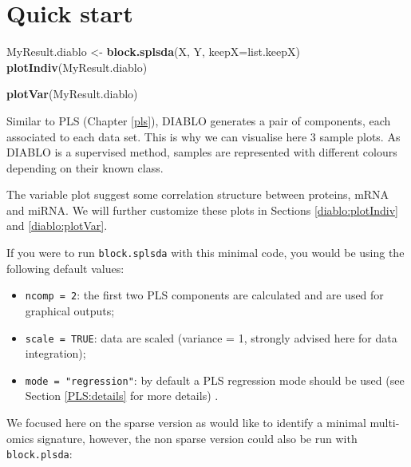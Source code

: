 \documentclass[]{book}
\newenvironment{Shaded}{\begin{snugshade}}{\end{snugshade}}
\newcommand{\DataTypeTok}[1]{\textcolor[rgb]{0.13,0.29,0.53}{#1}}
\newcommand{\KeywordTok}[1]{\textcolor[rgb]{0.13,0.29,0.53}{\textbf{#1}}}
\newcommand{\NormalTok}[1]{#1}
\newcommand{\StringTok}[1]{\textcolor[rgb]{0.31,0.60,0.02}{#1}}
\providecommand{\tightlist}{%
  \setlength{\itemsep}{0pt}\setlength{\parskip}{0pt}}
\begin{document}
\hypertarget{quick-start-3}{%
\section{Quick start}\label{quick-start-3}}

\begin{Shaded}
\begin{Highlighting}[]
\NormalTok{MyResult.diablo <-}\StringTok{ }\KeywordTok{block.splsda}\NormalTok{(X, Y, }\DataTypeTok{keepX=}\NormalTok{list.keepX)}
\KeywordTok{plotIndiv}\NormalTok{(MyResult.diablo)}
\end{Highlighting}
\end{Shaded}

\begin{Shaded}
\begin{Highlighting}[]
\KeywordTok{plotVar}\NormalTok{(MyResult.diablo)}
\end{Highlighting}
\end{Shaded}

Similar to PLS (Chapter \ref{pls}), DIABLO generates a pair of components, each associated to each data set. This is why we can visualise here 3 sample plots. As DIABLO is a supervised method, samples are represented with different colours depending on their known class.

The variable plot suggest some correlation structure between proteins, mRNA and miRNA. We will further customize these plots in Sections \ref{diablo:plotIndiv} and \ref{diablo:plotVar}.

If you were to run \texttt{block.splsda} with this minimal code, you would be using the following default values:

\begin{itemize}
\tightlist
\item
  \texttt{ncomp\ =\ 2}: the first two PLS components are calculated and are used for graphical outputs;
\item
  \texttt{scale\ =\ TRUE}: data are scaled (variance = 1, strongly advised here for data integration);
\item
  \texttt{mode\ =\ "regression"}: by default a PLS regression mode should be used (see Section \ref{PLS:details} for more details) .
\end{itemize}

We focused here on the sparse version as would like to identify a minimal multi-omics signature, however, the non sparse version could also be run with \texttt{block.plsda}:
\end{document}
